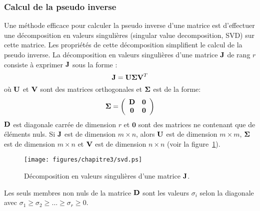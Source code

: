 \subsubsection{Calcul de la pseudo inverse}
Une méthode efficace pour calculer la pseudo inverse d'une matrice est d'effectuer
une décomposition en valeurs singulières (singular value decomposition, SVD) sur cette matrice. Les propriétés
de cette décomposition simplifient le calcul de la pseudo inverse.
La décomposition en valeurs singulières d'une matrice ${\mathbf{J}}$ de rang $r$ 
consiste à exprimer ${\mathbf{J}}$ sous la forme :
\begin{equation*}
  {\mathbf{J}} = {\mathbf{U}} {\mathbf{\Sigma}} {\mathbf{V}}^{T}
\end{equation*}
\noindent où ${\mathbf{U}}$ et ${\mathbf{V}}$ sont des matrices orthogonales et ${\mathbf{\Sigma}}$ est de la
forme:
\begin{equation}
  \mbf{\Sigma} = \left( \begin{array}{cc}
    \mbf{D} & \textbf{0}\\
    \textbf{0} & \textbf{0}
  \end{array} \right)
  \label{eq:sigmaSVD}
\end{equation}
\noindent ${\mathbf{D}}$ est diagonale carrée de dimension $r$ et $\textbf{0}$ sont des matrices ne contenant que
de éléments nuls. 
Si ${\mathbf{J}}$ est de dimension $m \times n$, alors ${\mathbf{U}}$ est de dimension $m \times m$, 
${\mathbf{\Sigma}}$ est de dimension $m \times n$ et ${\mathbf{V}}$ est de dimension $n \times n$ (voir la figure~\ref{fig:svd}). 
\begin{figure}[t]
  \begin{center}
    \texttt{[image: figures/chapitre3/svd.ps]}
  \end{center}
  \caption{Décomposition en valeurs singulières d'une matrice ${\mathbf{J}}$.}
  \label{fig:svd}
\end{figure}
Les seuls membres non nuls de la matrice ${\mathbf{D}}$ sont les valeurs
$\sigma_i$ selon la diagonale avec
$\sigma_1 \geq \sigma_2 \geq \ldots \geq \sigma_r \geq 0$. 

